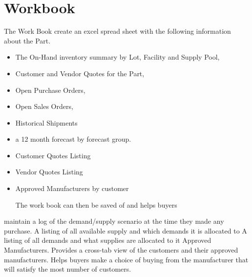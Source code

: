 \documentclass[letterpaper,10pt,english]{sphinxmanual}
\begin{document}
\section{Workbook}
\label{APS/Introduction:workbook}
The Work Book create an excel spread sheet with the following
information about the Part.
\begin{itemize}
\item {} 
The On-Hand inventory summary by Lot, Facility and Supply Pool,

\item {} 
Customer and Vendor Quotes for the Part,

\item {} 
Open Purchase Orders,

\item {} 
Open Sales Orders,

\item {} 
Historical Shipments

\item {} 
a 12 month forecast by forecast group.

\item {} 
Customer Quotes Listing

\item {} 
Vendor Quotes Listing

\item {} 
Approved Manufacturers by customer

The work book can then be saved of and helps buyers

\end{itemize}

maintain a log of the demand/supply scenario at the time they made any
purchase. A listing of all available supply and which demands it is
allocated to A listing of all demands and what supplies are allocated to
it Approved Manufacturers. Provides a cross-tab view of the customers
and their approved manufacturers. Helps buyers make a choice of buying
from the manufacturer that will satisfy the most number of customers.
\end{document}
